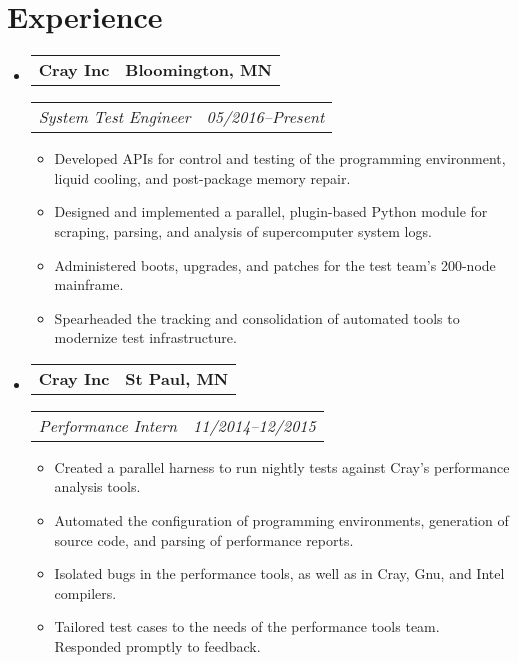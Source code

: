 \documentclass[11pt,letterpaper]{article}
\makeatletter
\newcommand{\headerrow}[2]{
  \begin{tabular*}{\linewidth}{l@{ \extracolsep{\fill} }r} #1 & #2
  \end{tabular*}}
\newcommand{\YearRange}[2]{#1--#2}
\newcommand{\ResumeSection}[1]{
  \section*{ {\color{MidnightBlue}#1 \sout{\hfill} } } }
\makeatother
\begin{document}

\ResumeSection{Experience}

\begin{itemize}[leftmargin=\parindent]
  \parskip=0.1em
  \itemsep=1.5em

  \item[]
    \headerrow{ \textbf{Cray Inc} }{ \textbf{Bloomington, MN} }
    \headerrow{ \emph{System Test Engineer} }
              { \emph{ \YearRange{05/2016}{Present} } }
    \begin{itemize}
        \item Developed APIs for control and testing of the programming environment, liquid cooling, and post-package memory repair.
        \item Designed and implemented a parallel, plugin-based Python module for scraping, parsing, and analysis of supercomputer system logs.
        \item Administered boots, upgrades, and patches for the test team's 200-node mainframe.
        \item Spearheaded the tracking and consolidation of automated tools to modernize test infrastructure.
    \end{itemize}

  \item[]
    \headerrow{ \textbf{Cray Inc} }{ \textbf{St Paul, MN} }
    \headerrow{ \emph{Performance Intern} }
              { \emph{ \YearRange{11/2014}{12/2015} } }
    \begin{itemize}
        \item Created a parallel harness to run nightly tests against Cray's performance analysis tools.
        \item Automated the configuration of programming environments, generation of source code, and parsing of performance reports.
        \item Isolated bugs in the performance tools, as well as in Cray, Gnu, and Intel compilers.
        \item Tailored test cases to the needs of the performance tools team. Responded promptly to feedback.
    \end{itemize}


\end{itemize}
\end{document}
